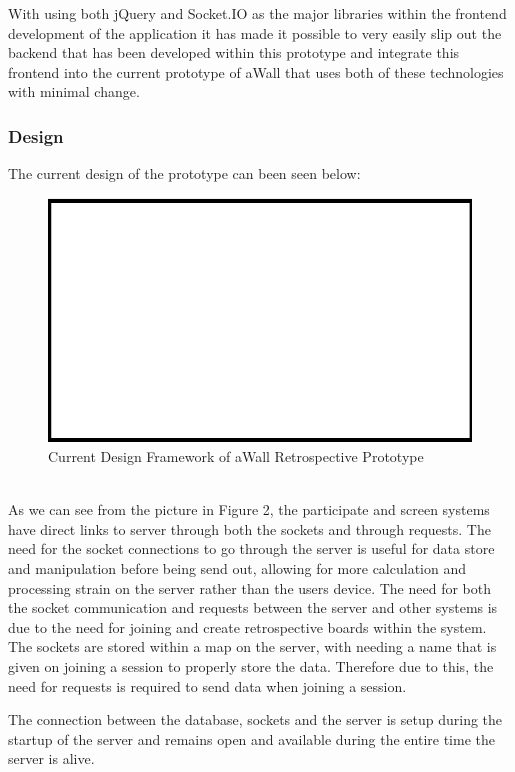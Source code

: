 With using both jQuery and Socket.IO as the major libraries within the frontend development of the application it has made it possible to very easily slip out the backend that has been developed within this prototype and integrate this frontend into the current prototype of aWall that uses both of these technologies with minimal change.

\subsubsection{Design}
The current design of the prototype can been seen below:
\begin{figure}[ht]
\centering
\includegraphics{placeholder}
\caption{Current Design Framework of aWall Retrospective Prototype}
\end{figure}
\\
As we can see from the picture in Figure 2, the participate and screen systems have direct links to server through both the sockets and through requests. The need for the socket connections to go through the server is useful for data store and manipulation before being send out, allowing for more calculation and processing strain on the server rather than the users device. 
The need for both the socket communication and requests between the server and other systems is due to the need for joining and create retrospective boards within the system. The sockets are stored within a map on the server, with needing a name that is given on joining a session to properly store the data. Therefore due to this, the need for requests is required to send data when joining a session.

The connection between the database, sockets and the server is setup during the startup of the server and remains open and available during the entire time the server is alive.
